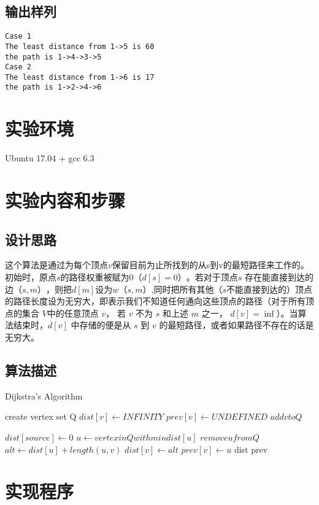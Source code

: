\documentclass{zjureport}
\begin{document}
\subsection{输出样列}
\begin{lstlisting}
Case 1
The least distance from 1->5 is 60
the path is 1->4->3->5
Case 2
The least distance from 1->6 is 17
the path is 1->2->4->6
\end{lstlisting}

\section{实验环境}
Ubuntu 17.04 + gcc 6.3

\section{实验内容和步骤}
	\subsection{设计思路}
	这个算法是通过为每个顶点$v$保留目前为止所找到的从s到v的最短路径来工作的。初始时，原点$s$的路径权重被赋为$0 （d[s] = 0）$。若对于顶点$s$ 存在能直接到达的边$（s,m）$，则把$d[m]$设为$w（s, m）$,同时把所有其他（$s$不能直接到达的）顶点的路径长度设为无穷大，即表示我们不知道任何通向这些顶点的路径（对于所有顶点的集合 $V $中的任意顶点 $v$， 若 $v$ 不为 $s$ 和上述 $m$ 之一， $d[v] = \inf$）。当算法结束时，$d[v]$ 中存储的便是从 $s$ 到 $v$ 的最短路径，或者如果路径不存在的话是无穷大。
	\newpage
	\subsection{算法描述}
		\begin{algorithm}[h!]
		\caption{Dijkstra's Algorithm} 
		\begin{algorithmic}[1]
				\State create vertex set Q
					\State $dist[v] \gets INFINITY$
					\State $prev[v] \gets UNDEFINED$
					\State $add v to Q$
				\EndFor

				$dist[source] \gets 0$
					\State $u \gets vertex in Q with min dist[u]$
					\State $remove u from Q$
						$alt \gets dist[u] + length(u,v)$
							$dist[v] \gets alt$
							$prev[v] \gets u$
						\EndIf
					\EndFor
				\EndWhile
				\Return dist prev
			\EndFunction
		\end{algorithmic}
		\end{algorithm}
\section{实现程序}
	\begin{clause}
		
	\end{clause}
\end{document}
